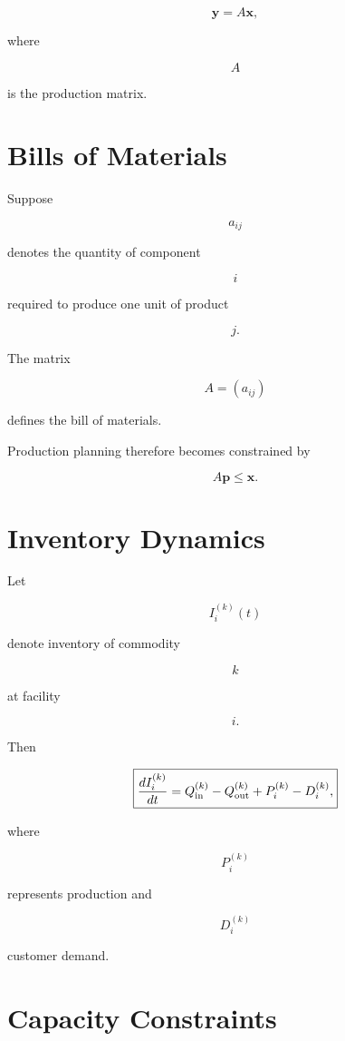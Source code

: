 \documentclass[11pt,fleqn]{book}
\numberwithin{equation}{chapter}
\theoremstyle{plain}
\theoremstyle{definition}
\theoremstyle{remark}
\begin{document}
\[
\boxed{
\mathbf y
=
A\mathbf x,
}
\]

where

\[
A
\]

is the production matrix.


\section{Bills of Materials}

Suppose

\[
a_{ij}
\]

denotes the quantity of component

\[
i
\]

required to produce one unit of product

\[
j.
\]

The matrix

\[
A=(a_{ij})
\]

defines the bill of materials.

Production planning therefore becomes constrained by

\[
A\mathbf p
\le
\mathbf x.
\]


\section{Inventory Dynamics}

Let

\[
I_i^{(k)}(t)
\]

denote inventory of commodity

\[
k
\]

at facility

\[
i.
\]

Then

\[
\boxed{
\frac{dI_i^{(k)}}{dt}
=
Q_{\rm in}^{(k)}
-
Q_{\rm out}^{(k)}
+
P_i^{(k)}
-
D_i^{(k)},
}
\]

where

\[
P_i^{(k)}
\]

represents production and

\[
D_i^{(k)}
\]

customer demand.


\section{Capacity Constraints}
\end{document}
